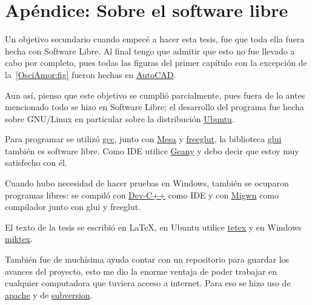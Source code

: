 \chapter*{Apéndice: Sobre el software libre}
\label{sec:apendice}
Un objetivo secundario cuando empecé a hacer esta tesis, fue que toda ella fuera hecha con Software Libre. Al final tengo que admitir que esto no fue llevado a cabo por completo, pues todas las figuras del primer capítulo con la excepción de la~\ref{OsciAmor:fig} fueron hechas en \href{http://www.autodesk.es}{AutoCAD}.

Aun así, pienso que este objetivo se cumplió parcialmente, pues fuera de lo antes mencionado todo se hizo en Software Libre; el desarrollo del programa fue hecha sobre GNU/Linux en particular sobre la distribución \href{www.ubuntu.com}{Ubuntu}.

Para programar se utilizó \href{http://gcc.gnu.org/}{gcc}, junto con \href{http://www.mesa3d.org/}{Mesa} y \href{http://freeglut.sourceforge.net/}{freeglut}, la biblioteca \href{http://www.cs.unc.edu/rademach/glui/}{glui} también es software libre. Como IDE utilice \href{http://geany.uvena.de/}{Geany} y debo decir que estoy muy satisfecho con él.

Cuando hubo necesidad de hacer pruebas en Windows, también se ocuparon programas libres: se compiló con \href{http://www.bloodshed.net/devcpp.html}{Dev-C++} como IDE y con \href{http://www.mingw.org/}{Migwn} como compilador junto con glui y freeglut.

El texto de la tesis se escribió en \LaTeX, en Ubuntu utilice \href{http://web.bilkent.edu.tr/History/valley/tetex-index.html}{tetex} y en Windows \href{http://miktex.org/}{miktex}.

También fue de muchísima ayuda contar con un repositorio para guardar los avances del proyecto, esto me dio la enorme ventaja de poder trabajar en cualquier computadora que tuviera acceso a internet. Para eso se hizo uso de \href{http://www.apache.org/}{apache} y de \href{http://subversion.tigris.org/}{subversion}.
